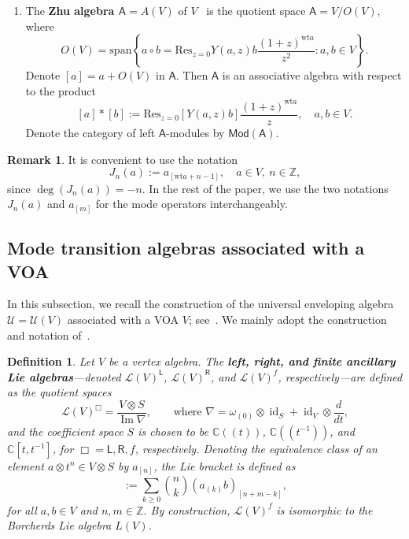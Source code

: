 \documentclass[12pt,a4paper,reqno]{amsart}
\numberwithin{equation}{section}
\newtheorem{definition}[theorem]{Definition}
\theoremstyle{definition}
\newtheorem{remark}[theorem]{Remark}
\newcommand{\im}{\operatorname{Im}}
\newcommand{\id}{\operatorname{id}}
\newcommand{\Z}{\mathbb{Z}}
\def\L{\mathsf{L}}
\def\R{\mathsf{R}}
\def\spn{\mathrm{span}}
\def\wt{\mathrm{wt}}
\def\scrU{\mathscr{U}}
\def\A{\mathsf{A}}
\def\Res{\mathrm{Res}}
\begin{document}
\begin{enumerate}
\[    \]
We write $\deg(a_{[n]})=\wt a-n-1$ for all $a_{[n]}\in L(V)$.
\item The \textbf{Zhu algebra $\A=A(V)$} of $V$~\cite[Theorem 2.1.1]{zhu1996modular} is the quotient space
$\A=V/O(V),$ where
\[	O(V)=\spn\left\{ a\circ b=\Res_{z=0}Y(a,z)b\frac{(1+z)^{\wt a}}{z^2}: a,b\in V\right\}.
		\]
Denote $[a]=a+O(V)$ in $\A$. Then $\A$ is an associative algebra with respect to the product
		\begin{equation}\label{eq:prodAV}
			[a]\ast [b]:=\Res_{z=0} [Y(a,z)b]\frac{(1+z)^{\wt a}}{z},\quad a,b\in V.
		\end{equation}
		Denote the category of left $\A$-modules by $\mathsf{Mod}(\A)$.
\end{enumerate}

\begin{remark}
It is convenient to use the notation
\[
J_n(a):=a_{[\wt a+n-1]},\quad a\in V,\ n\in \Z,
\]
since $\deg(J_n(a))=-n$. In the rest of the paper, we use the two notations $J_n(a)$ and $a_{[m]}$ for the mode operators interchangeably.  
\end{remark}







\subsection{Mode transition algebras associated with a VOA}
In this subsection, we recall the construction of the universal enveloping algebra $\scrU=\scrU(V)$ associated with a VOA $V$; see~\cite{FZ92,DGK2}. We mainly adopt the construction and notation of~\cite[Section 2]{DGK2}.
\begin{definition}
Let $V$ be a vertex algebra. The \textbf{left, right, and finite ancillary Lie algebras}---denoted $\mathcal{L}(V)^\L$, $\mathcal{L}(V)^\R$, and $\mathcal{L}(V)^f$, respectively---are defined as the quotient spaces
\begin{equation}
    \mathcal{L}(V)^{\Box} = \frac{V \otimes S}{\im \nabla}, \qquad \text{where } \nabla = \omega_{(0)} \otimes \id_S + \id_V \otimes \frac{d}{dt},
\end{equation}
and the coefficient space $S$ is chosen to be $\mathbb{C}((t))$, $\mathbb{C}((t^{-1}))$, and $\mathbb{C}[t,t^{-1}]$, for $\Box = \L,\R,f$, respectively. Denoting the equivalence class of an element $a \otimes t^n \in V \otimes S$ by $a_{[n]}$, the Lie bracket is defined as
\begin{equation}
    [a_{[n]}, b_{[m]}] := \sum_{k \ge 0} \binom{n}{k} (a_{(k)}b)_{[n+m-k]},
\end{equation}
for all $a, b \in V$ and $n, m\in\Z$. By construction, $\mathcal{L}(V)^f$ is isomorphic to the Borcherds Lie algebra $L(V)$.
\end{definition}
\end{document}

